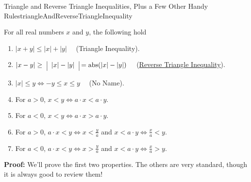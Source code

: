 \begin{propColor}{Triangle and Reverse Triangle Inequalities, Plus a Few Other Handy Rules}{triangleAndReverseTriangleInequality}

For all real numbers $x$ and $y$, the following hold
\begin{enumerate}
\renewcommand{\labelenumi}{(\alph{enumi})}
\setlength{\itemsep}{.2cm}
    
    \item $|x + y| \le |x| + |y|$~~ (Triangle Inequality).

    \item $|x-y| \ge ~~\vrule height .3cm depth 0.2cm ~|x| -|y| ~~ \vrule = {\rm abs}(|x| -|y|)$ ~~(\href{https://youtu.be/zdfJlebX054}{Reverse Triangle Inequality}).

    \item $|x| \le y \iff -y \le x \le y$~~ (No Name).

    \item For $a>0$, $x < y \iff a\cdot x < a \cdot y$. 

    \item   For $a<0$, $x < y \iff a\cdot x > a \cdot y$.

    \item For $a>0$, $a \cdot x < y \iff x < \frac{y}{a}$ and  $x < a \cdot y \iff  \frac{x}{a} < y$. 

    \item For $a<0$, $a \cdot x < y \iff x >\frac{y}{a}$ and  $x < a \cdot y \iff  \frac{x}{a} > y$. 
\end{enumerate}

\bigskip
 
\end{propColor}

\textbf{Proof:} We'll prove the first two properties. The others are very standard, though it is always good to review them! 

